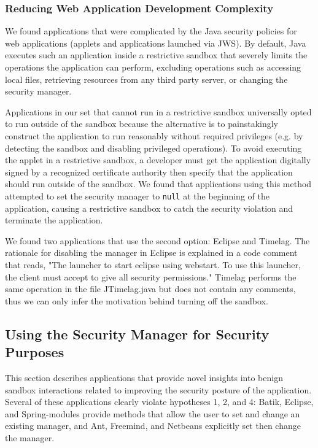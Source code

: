 \documentclass{sig-alternate}
\begin{document}
\subsubsection{Reducing Web Application Development Complexity}\label{sub:Reducing-Web-Application-Complexity}

We found applications that were complicated by the Java security policies
for web applications (applets and applications launched via JWS). By default, Java executes such an application inside a restrictive
sandbox that severely limits the operations the application can perform,
excluding operations such as accessing local files, retrieving resources
from any third party server, or changing the security manager. 

Applications in our set that cannot run in a restrictive sandbox universally opted to run outside of the sandbox because the alternative is to painstakingly construct the application to run reasonably without required privileges (e.g. by detecting the sandbox and disabling privileged operations). To avoid executing the applet in a restrictive
sandbox, a developer must get the application digitally signed
by a recognized certificate authority then specify that the application should
run outside of the sandbox. We found that applications using this method attempted
to set the security manager to \texttt{null} at the beginning of the
application, causing a restrictive sandbox to catch the security violation and
terminate the application.

We found two applications that use the second option: Eclipse and
Timelag. The rationale for disabling the manager in Eclipse is explained in a code comment that reads, "The launcher to start eclipse using webstart. To use this launcher, the client must accept to give all security permissions." Timelag performs the same operation in the file JTimelag.java but does not contain any comments, thus we can only infer the motivation behind turning off the sandbox.

\subsection{Using the Security Manager for Security Purposes}\label{sub:Using-the-Security}

This section describes applications that provide novel insights into benign sandbox interactions related to improving the security
posture of the application. Several of these applications clearly violate hypotheses 1, 2, and 4: Batik, Eclipse, and Spring-modules provide
methods that allow the user to set and change an existing manager,
and Ant, Freemind, and Netbeans explicitly set then change the manager.
\end{document}
